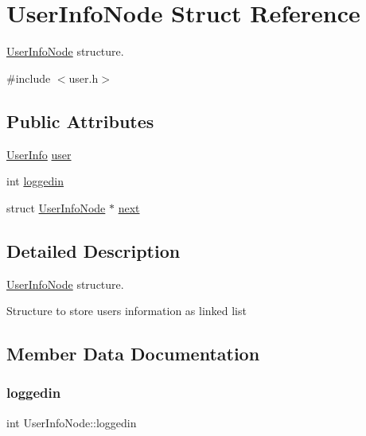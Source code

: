 \hypertarget{structUserInfoNode}{}\section{User\+Info\+Node Struct Reference}
\label{structUserInfoNode}


\hyperlink{structUserInfoNode}{User\+Info\+Node} structure.  




{\ttfamily \#include $<$user.\+h$>$}

\subsection*{Public Attributes}
\begin{DoxyCompactItemize}
\item 
\hyperlink{user_8h_a50f85a8d84a82c18fb78a8aebba46bef}{User\+Info} \hyperlink{structUserInfoNode_a6a59492f775ec3e2907ad836a851cff4}{user}
\item 
int \hyperlink{structUserInfoNode_a6ddd02b57f616d47cf243d8dd615bae5}{loggedin}
\item 
struct \hyperlink{structUserInfoNode}{User\+Info\+Node} $\ast$ \hyperlink{structUserInfoNode_a1ec8cd5d9a96c37b18f171ffbdb25fe0}{next}
\end{DoxyCompactItemize}


\subsection{Detailed Description}
\hyperlink{structUserInfoNode}{User\+Info\+Node} structure. 

Structure to store user\textquotesingle{}s information as linked list 

\subsection{Member Data Documentation}
\mbox{\label{structUserInfoNode_a6ddd02b57f616d47cf243d8dd615bae5}} 
\subsubsection{\texorpdfstring{loggedin}{loggedin}}
{\footnotesize\ttfamily int User\+Info\+Node\+::loggedin}

